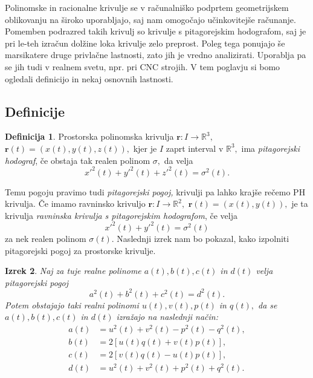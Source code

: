 \documentclass[12pt,a4paper,twoside]{article}
\theoremstyle{definition} %
\newtheorem{definicija}{Definicija}[section]
\theoremstyle{plain} %
\newtheorem{izrek}[definicija]{Izrek}
\theoremstyle{primerstyle}
\numberwithin{equation}{section}  %
\newcommand{\R}{\mathbb R}
\newcommand{\rV}{\mathbf{r}}
\begin{document}
Polinomske in racionalne krivulje se v računalniško podprtem geometrijskem oblikovanju na široko uporabljajo, saj nam omogočajo učinkovitejše računanje. Pomemben podrazred takih krivulj so krivulje s pitagorejskim hodografom, saj je pri le-teh izračun dolžine loka krivulje zelo preprost. Poleg tega ponujajo še marsikatere druge privlačne lastnosti, zato jih je vredno analizirati. Uporablja pa se jih tudi v realnem svetu, npr. pri CNC strojih. V tem poglavju si bomo ogledali definicijo in nekaj osnovnih lastnosti.

\subsection{Definicije}

\begin{definicija}
	Prostorska polinomska krivulja $\rV:I \to \R^3,$ $\rV(t)=(x(t),y(t),z(t)),$ kjer je $I$ zaprt interval v $\R^3,$ ima \emph{pitagorejski hodograf}, če obstaja tak realen polinom $\sigma,$ da velja
	\begin{equation}
		\label{pitagorejski}
		x'^2(t)+y'^2(t)+z'^2(t)=\sigma^2(t).
	\end{equation}
\end{definicija}

Temu pogoju pravimo tudi \emph{pitagorejski pogoj,} krivulji pa lahko krajše rečemo PH krivulja. Če imamo ravninsko krivuljo $\rV:I \to \R^2,$ $\rV(t)=(x(t),y(t)),$ je ta krivulja \emph{ravninska krivulja s pitagorejskim hodografom}, če velja
\begin{equation}
	\label{ravninski_pitagorejski}
	x'^2(t)+y'^2(t)=\sigma^2(t)
\end{equation}
za nek realen polinom $\sigma(t).$ Naslednji izrek nam bo pokazal, kako izpolniti pitagorejski pogoj za prostorske krivulje.
\begin{izrek}
	\label{PH_pogoj_izrek}
	Naj za tuje realne polinome $a(t),b(t),c(t)$ in $d(t)$ velja pitagorejski pogoj
	\begin{equation}
		\label{pogoj_izrek4_2}
		a^2(t)+b^2(t)+c^2(t)=d^2(t).
	\end{equation}
	Potem obstajajo taki realni polinomi $u(t),v(t),p(t)$ in $q(t),$ da se $a(t),b(t),c(t)$ in $d(t)$ izražajo na naslednji način:
	\begin{align}
		a(t)&=u^2(t)+v^2(t)-p^2(t)-q^2(t), \nonumber \\
		b(t)&=2[u(t)q(t)+v(t)p(t)], \label{izrek4_3} \\
		c(t)&=2[v(t)q(t)-u(t)p(t)], \nonumber \\
		d(t)&=u^2(t)+v^2(t)+p^2(t)+q^2(t). \nonumber
	\end{align}
\end{izrek}
\end{document}
